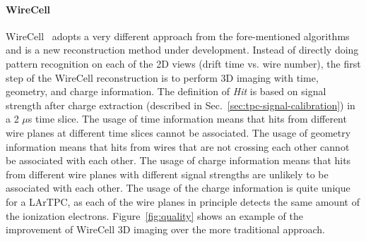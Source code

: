 \paragraph{WireCell}
WireCell~\cite{wire-cell} adopts a very different approach from the 
fore-mentioned algorithms and is a new reconstruction method under development.
Instead of directly doing pattern recognition on each of the 2D views (drift 
time vs. wire number), the first step of the WireCell reconstruction is to 
perform 3D imaging with time, geometry, and charge information. The definition
of \textit{Hit} is based on signal strength after charge extraction (described in 
Sec.~\ref{sec:tpc-signal-calibration}) in a 2 $\mu$s time slice. The usage of 
time information means that hits from different wire planes at different time 
slices cannot be associated. The usage of geometry information means that hits
from wires that are not crossing each other cannot be associated with each other. 
The usage of charge information means that hits from different wire planes
with different signal strengths are unlikely to be associated with each other. The 
usage of the charge information is quite unique for a LArTPC, as each of the 
wire planes in principle detects the same amount of the ionization electrons. 
Figure~\ref{fig:quality} shows an example of the improvement of WireCell 3D imaging
over the more traditional approach. 

